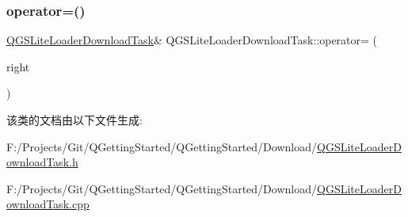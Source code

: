 \subsubsection{\texorpdfstring{operator=()}{operator=()}\hspace{0.1cm}{\footnotesize\ttfamily [2/2]}}
{\footnotesize\ttfamily \mbox{\hyperlink{class_q_g_s_lite_loader_download_task}{Q\+G\+S\+Lite\+Loader\+Download\+Task}}\& Q\+G\+S\+Lite\+Loader\+Download\+Task\+::operator= (\begin{DoxyParamCaption}\item[{\mbox{\hyperlink{class_q_g_s_lite_loader_download_task}{Q\+G\+S\+Lite\+Loader\+Download\+Task}} \&\&}]{right }\end{DoxyParamCaption})\hspace{0.3cm}{\ttfamily [delete]}}



该类的文档由以下文件生成\+:\begin{DoxyCompactItemize}
\item 
F\+:/\+Projects/\+Git/\+Q\+Getting\+Started/\+Q\+Getting\+Started/\+Download/\mbox{\hyperlink{_q_g_s_lite_loader_download_task_8h}{Q\+G\+S\+Lite\+Loader\+Download\+Task.\+h}}\item 
F\+:/\+Projects/\+Git/\+Q\+Getting\+Started/\+Q\+Getting\+Started/\+Download/\mbox{\hyperlink{_q_g_s_lite_loader_download_task_8cpp}{Q\+G\+S\+Lite\+Loader\+Download\+Task.\+cpp}}\end{DoxyCompactItemize}
